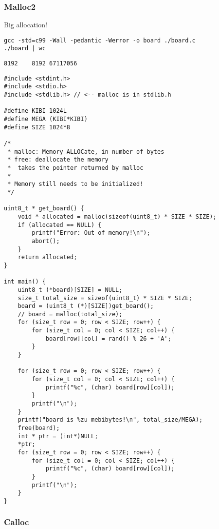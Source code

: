 \documentclass[11pt]{article}
\begin{document}
\subsubsection{Malloc2}
\label{sec:org46d183d}

Big allocation!

\begin{verbatim}
gcc -std=c99 -Wall -pedantic -Werror -o board ./board.c
./board | wc
\end{verbatim}

\begin{verbatim}
8192    8192 67117056
\end{verbatim}

\begin{verbatim}
#include <stdint.h>
#include <stdio.h>
#include <stdlib.h> // <-- malloc is in stdlib.h

#define KIBI 1024L
#define MEGA (KIBI*KIBI)
#define SIZE 1024*8

/*
 * malloc: Memory ALLOCate, in number of bytes
 * free: deallocate the memory
 *  takes the pointer returned by malloc
 * 
 * Memory still needs to be initialized!
 */

uint8_t * get_board() {
    void * allocated = malloc(sizeof(uint8_t) * SIZE * SIZE);
    if (allocated == NULL) {
        printf("Error: Out of memory!\n");
        abort();
    }
    return allocated;
}

int main() {
    uint8_t (*board)[SIZE] = NULL;
    size_t total_size = sizeof(uint8_t) * SIZE * SIZE;
    board = (uint8_t (*)[SIZE])get_board();
    // board = malloc(total_size);
    for (size_t row = 0; row < SIZE; row++) {
        for (size_t col = 0; col < SIZE; col++) {
            board[row][col] = rand() % 26 + 'A';
        }
    }

    for (size_t row = 0; row < SIZE; row++) {
        for (size_t col = 0; col < SIZE; col++) {
            printf("%c", (char) board[row][col]);
        }
        printf("\n");
    }
    printf("board is %zu mebibytes!\n", total_size/MEGA);
    free(board);
    int * ptr = (int*)NULL;
    *ptr;
    for (size_t row = 0; row < SIZE; row++) {
        for (size_t col = 0; col < SIZE; col++) {
            printf("%c", (char) board[row][col]);
        }
        printf("\n");
    }
}
\end{verbatim}

\subsubsection{Calloc}
\label{sec:org3ca05e3}
\end{document}
